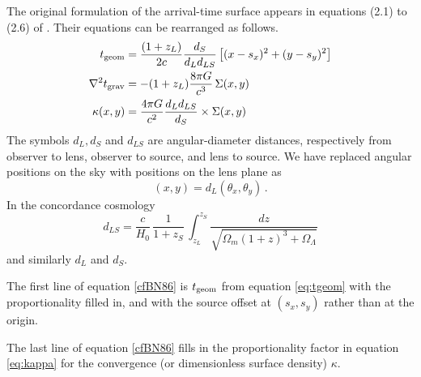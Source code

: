 \documentclass[usenatbib]{mn2e}
\begin{document}
The original formulation of the arrival-time surface appears in
equations (2.1) to (2.6) of \cite{1986ApJ...310..568B}.  Their
equations can be rearranged as follows.
\begin{equation} \label{cfBN86}
\begin{aligned}
t_{\rm geom} &= \frac{(1+z_L)}{2c} \frac{d_S}{d_L d_{LS}}
\left[ (x-s_x)^2 + (y-s_y)^2 \right] \\
\nabla^2 t_{\rm grav} &= -(1+z_L)\frac{8\pi G}{c^3} \, \Sigma(x,y) \\
\kappa(x,y) &= \frac{4\pi G}{c^2} \frac{d_L d_{LS}}{d_S}
               \times \Sigma(x,y)
\end{aligned}
\end{equation}
The symbols $d_L,d_S$ and $d_{LS}$ are angular-diameter distances,
respectively from observer to lens, observer to source, and lens to
source. We have replaced angular positions on the sky with positions
on the lens plane as
\begin{equation}
(x,y) = d_L (\theta_x,\theta_y) \,.
\end{equation}
In the concordance cosmology
\begin{equation}
d_{LS} = \frac{c}{H_0}\,\frac1{1+z_S} \,
\int_{z_L}^{z_S} \!\! \frac{dz}{\sqrt{\Omega_m(1+z)^3 + \Omega_\Lambda}}
\end{equation}
and similarly $d_L$ and $d_S$.  

The first line of equation \eqref{cfBN86} is $t_{\rm geom}$ from
equation \eqref{eq:tgeom} with the proportionality filled in, and with
the source offset at $(s_x,s_y)$ rather than at the origin.

The last line of equation \eqref{cfBN86} fills in the proportionality
factor in equation \eqref{eq:kappa} for the convergence (or
dimensionless surface density) $\kappa$.
\end{document}
